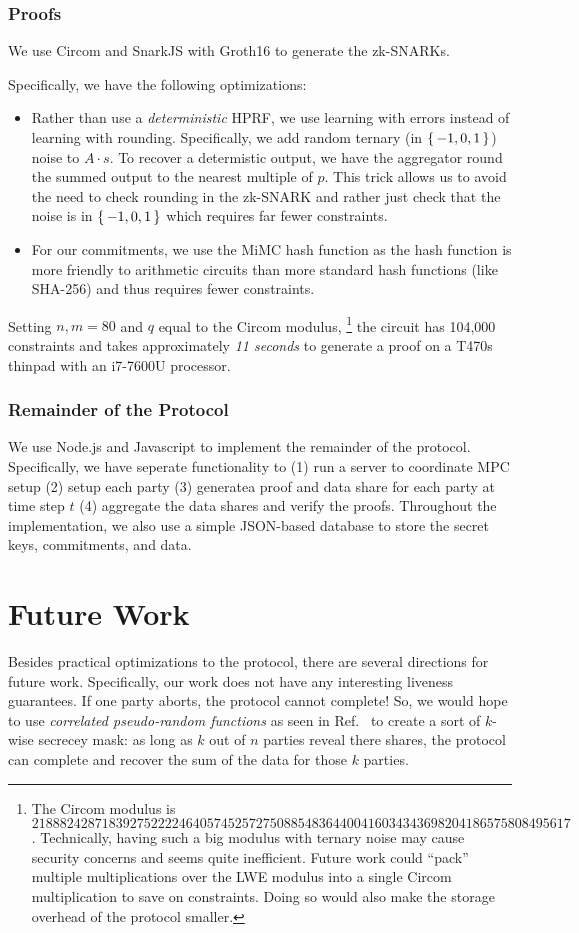 \subsubsection*{Proofs}
We use Circom and SnarkJS with Groth16 \cite{groth2016size} to generate the zk-SNARKs.

Specifically, we have the following optimizations:
\begin{itemize}
	\item Rather than use a \emph{deterministic} HPRF, we use learning with errors instead of learning with rounding.
		Specifically, we add random ternary (in $\set{-1, 0, 1}$) noise to $A \cdot s$.
		To recover a determistic output, we have the aggregator round the summed output to the nearest multiple of $p$.
		This trick allows us to avoid the need to check rounding in the zk-SNARK and rather just check that the noise is in $\set{-1, 0, 1}$ which requires far fewer constraints.
	\item For our commitments, we use the MiMC hash function as the hash function is more friendly to arithmetic circuits than more standard hash functions (like SHA-256) and thus requires fewer constraints.
\end{itemize}
Setting $n, m = 80$ and $q$ equal to the Circom modulus,
\footnote{
	The Circom modulus is $21888242871839275222246405745257275088548364400416034343698204186575808495617$.
	Technically, having such a big modulus with ternary noise may cause security concerns and seems quite inefficient.
	Future work could ``pack'' multiple multiplications over the LWE modulus into a single Circom multiplication to save on constraints.
	Doing so would also make the storage overhead of the protocol smaller.
}
the circuit has 104,000 constraints and takes approximately \emph{11 seconds} to generate a proof on a T470s thinpad with an i7-7600U processor.

\subsubsection*{Remainder of the Protocol}
We use Node.js and Javascript to implement the remainder of the protocol.
Specifically, we have seperate functionality to (1) run a server to coordinate MPC setup (2) setup each party (3) generatea proof and data share for each party at time step $t$ (4) aggregate the data shares and verify the proofs.
Throughout the implementation, we also use a simple JSON-based database to store the secret keys, commitments, and data.

\section{Future Work}
Besides practical optimizations to the protocol, there are several directions for future work.
Specifically, our work does not have any interesting liveness guarantees.
If one party aborts, the protocol cannot complete!
So, we would hope to use \emph{correlated pseudo-random functions} as seen in Ref.~\cite{boyle2020correlated} to create a sort of $k$-wise secrecey mask: as long as $k$ out of $n$ parties reveal there shares, the protocol can complete and recover the sum of the data for those $k$ parties.


